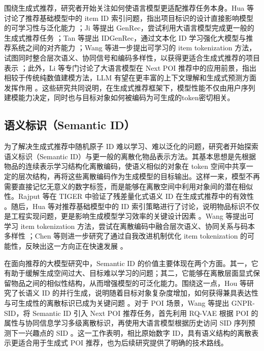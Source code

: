 围绕生成式推荐，研究者开始关注如何使语言模型更适配推荐任务本身。Hua 等讨论了推荐基础模型中的 item ID 索引问题，指出项目标识的设计直接影响模型的可学习性与泛化能力 \cite{hua2023index}；Ji 等提出 GenRec，尝试利用大语言模型完成更一般的生成式推荐任务 \cite{ji2024genrec}；Tan 等提出 IDGenRec，通过文本化 ID 学习强化大模型与推荐系统之间的对齐能力 \cite{tan2024idgenrec}；Wang 等进一步提出可学习的 item tokenization 方法，试图同时整合层次语义、协同信号和编码多样性，以获得更适合生成式推荐的项目表示 \cite{wang2024letter}；此外，Li 等专门讨论了大语言模型在 Next POI 推荐中的应用前景，指出相较于传统纯数值建模方法，LLM 有望在更丰富的上下文理解和生成式预测方面发挥作用 \cite{li2024llm4poi}。这些研究共同说明，在生成式推荐框架下，模型性能不仅由用户序列建模能力决定，同时也与目标对象如何被编码为可生成的token密切相关。


\subsection{语义标识（Semantic ID）}

为了解决生成式推荐中随机原子 ID 难以学习、难以泛化的问题，研究者开始探索语义标识（Semantic ID）与更一般的离散化物品表示方法。其基本思想是先根据物品的连续表示学习结构化离散编码，使语义相似的对象在 token 空间中共享一定的层次结构，再将这些离散编码作为生成模型的目标输出。这样一来，模型不再需要直接记忆无意义的数字标签，而是能够在离散空间中利用对象间的潜在相似性。Rajput 等在 TIGER 中验证了残差量化式语义 ID 在生成式推荐中的有效性 \cite{rajput2023tiger}。随后，Hua 等对推荐基础模型中的 ID 索引策略进行了讨论，说明物品标识不仅是工程实现问题，更是影响生成模型学习效率的关键设计因素 \cite{hua2023index}。Wang 等提出可学习 item tokenization 方法，尝试在离散编码中融合层次语义、协同关系与码本多样性 \cite{wang2024letter}；Chen 等则进一步研究了通过自我改进机制优化 item tokenization 的可能性，反映出这一方向正在快速发展 \cite{chen2024selfimproveitemtoken}。

在面向推荐的大模型研究中，Semantic ID 的价值主要体现在两个方面。其一，它有助于缓解生成空间过大、目标难以学习的问题；其二，它能够在离散层面显式保留物品之间的相似性结构，从而增强模型的可泛化能力。围绕这一点，Hou 等研究了长语义 ID 的并行生成，说明随着目标对象复杂度增加，如何获得兼具表达性与可生成性的离散标识已成为关键问题 \cite{hou2025longsid}。对于 POI 场景，Wang 等提出 GNPR-SID，将 Semantic ID 引入 Next POI 推荐任务，首先利用 RQ-VAE 根据 POI 的属性与协同信息学习多级离散标识，再使用大语言模型根据历史访问 SID 序列预测下一兴趣点的 SID \cite{wang2025gnprsid}。这一工作表明，相比原始数字 ID，具有语义结构的离散表示更适合用于生成式 POI 推荐，也为后续研究提供了明确的技术路线。

